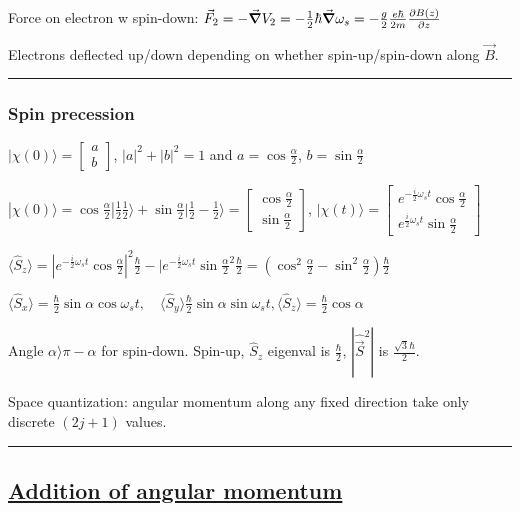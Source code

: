 Force on electron w spin-down: $\vec{F}_2 = -\vec{\grad} V_2 = -\frac{1}{2} \hbar \vec{\grad} \omega_s = - \frac{g}{2} \frac{e \hbar}{2m} \pdv{B(z)}{z}$

Electrons deflected up/down depending on whether spin-up/spin-down along $\vec{B}$.

\hrule height 0.05pt

\subsubsection{Spin precession}

$| \chi(0) \rangle = \begin{bmatrix} a \\ b \end{bmatrix}$, $|a|^2 + |b|^2 = 1$ and $a = \cos \frac{\alpha}{2}$, $b = \sin \frac{\alpha}{2}$

$|\chi (0) \rangle = \cos \frac{\alpha}{2} | \frac{1}{2} \frac{1}{2} \rangle + \sin \frac{\alpha}{2} | \frac{1}{2} -\frac{1}{2} \rangle = \begin{bmatrix} \cos \frac{\alpha}{2} \\ \sin \frac{\alpha}{2} \end{bmatrix}$, 
\tiny
$|\chi(t) \rangle = \begin{bmatrix} e^{-\frac{i}{2} \omega_s t} \cos \frac{\alpha}{2} \\ e^{\frac{i}{2} \omega_s t} \sin \frac{\alpha}{2} \end{bmatrix}$
\scriptsize

$\langle \widehat{S}_z \rangle = | e^{-\frac{i}{2} \omega_s t} \cos \frac{\alpha}{2}|^2 \frac{\hbar}{2} - |e^{-\frac{i}{2} \omega_s t} \sin \frac{\alpha}{2}^2 \frac{\hbar}{2} = (\cos^2 \frac{\alpha}{2} - \sin^2 \frac{\alpha}{2}) \frac{\hbar}{2}$

$\langle \widehat{S}_x \rangle = \frac{\hbar}{2} \sin \alpha \cos \omega_s t, \quad \langle \widehat{S}_y \rangle \frac{\hbar}{2} \sin \alpha \sin \omega_s t, \langle \widehat{S}_z \rangle = \frac{\hbar}{2} \cos \alpha$

Angle $\alpha \rangle \pi - \alpha$ for spin-down. Spin-up, $\widehat{S}_z$ eigenval is $\frac{\hbar}{2}$, $|\widehat{\vec{S}}^2|$ is $\frac{\sqrt{3} \hbar}{2}$.

Space quantization: angular momentum along any fixed direction take only discrete $(2j+1)$ values.

\hrule height 0.05pt

\subsection{\underline{Addition of angular momentum}}

